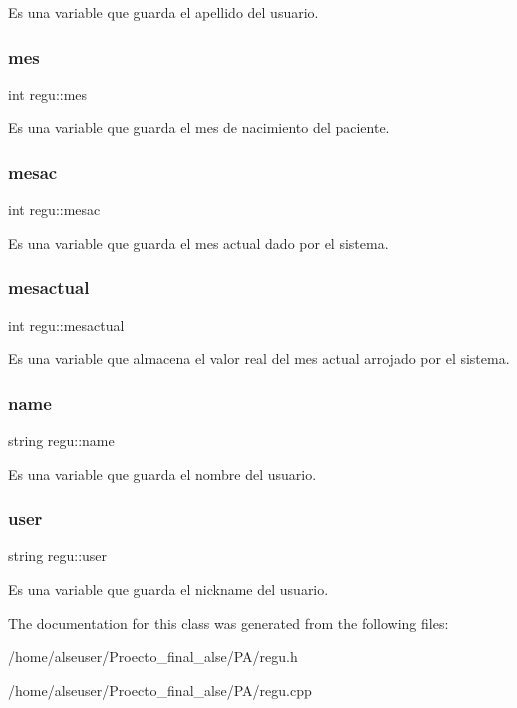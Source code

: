 Es una variable que guarda el apellido del usuario. \mbox{\label{classregu_aa428968b67b0b19475ba8570238a04fd}} 
\subsubsection{\texorpdfstring{mes}{mes}}
{\footnotesize\ttfamily int regu\+::mes}

Es una variable que guarda el mes de nacimiento del paciente. \mbox{\label{classregu_a132dfdf2c854220e77bd72ef8512f0bd}} 
\subsubsection{\texorpdfstring{mesac}{mesac}}
{\footnotesize\ttfamily int regu\+::mesac}

Es una variable que guarda el mes actual dado por el sistema. \mbox{\label{classregu_ae5fe72d4503fe08944e2d439aca203c6}} 
\subsubsection{\texorpdfstring{mesactual}{mesactual}}
{\footnotesize\ttfamily int regu\+::mesactual}

Es una variable que almacena el valor real del mes actual arrojado por el sistema. \mbox{\label{classregu_a5f9ec0ff54143b14c6cd04f360c04d2c}} 
\subsubsection{\texorpdfstring{name}{name}}
{\footnotesize\ttfamily string regu\+::name}

Es una variable que guarda el nombre del usuario. \mbox{\label{classregu_a22cc21aa95246c8b198c0e43dc932c9b}} 
\subsubsection{\texorpdfstring{user}{user}}
{\footnotesize\ttfamily string regu\+::user}

Es una variable que guarda el nickname del usuario. 

The documentation for this class was generated from the following files\+:\begin{DoxyCompactItemize}
\item 
/home/alseuser/\+Proecto\+\_\+final\+\_\+alse/\+P\+A/regu.\+h\item 
/home/alseuser/\+Proecto\+\_\+final\+\_\+alse/\+P\+A/regu.\+cpp\end{DoxyCompactItemize}
